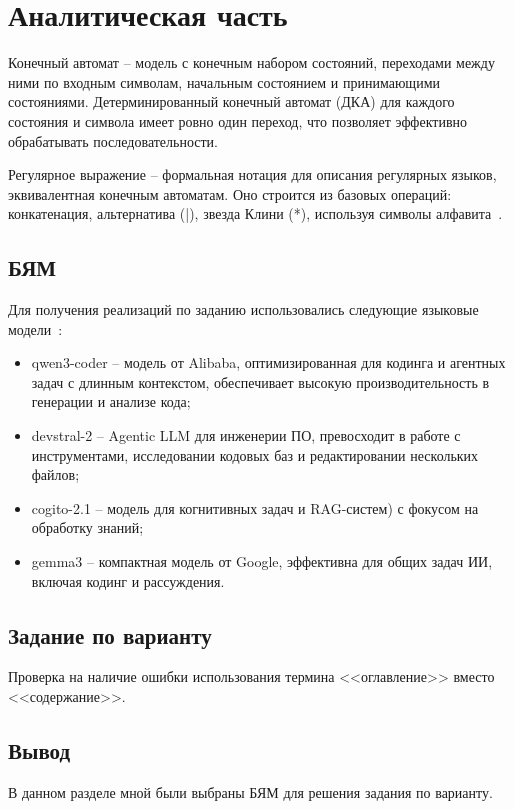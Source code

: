 \chapter{Аналитическая часть}

Конечный автомат -- модель с конечным набором состояний, переходами между ними по входным символам, начальным состоянием и  принимающими состояниями. Детерминированный конечный автомат (ДКА) для каждого состояния и символа имеет ровно один переход, что позволяет эффективно обрабатывать последовательности.

Регулярное выражение -- формальная нотация для описания регулярных языков, эквивалентная конечным автоматам. Оно строится из базовых операций: конкатенация, альтернатива (|), звезда Клини (*), используя символы алфавита~\cite{lit2}.

\section{БЯМ}

Для получения реализаций по заданию использовались следующие языковые модели~\cite{lit1}:
\begin{itemize}
	\item qwen3-coder -- модель от Alibaba, оптимизированная для кодинга и агентных задач с длинным контекстом, обеспечивает высокую производительность в генерации и анализе кода;
	\item devstral-2 -- Agentic LLM для инженерии ПО, превосходит в работе с инструментами, исследовании кодовых баз и редактировании нескольких файлов;
	\item cogito-2.1 -- модель для когнитивных задач и RAG-систем) с фокусом на обработку знаний;
	\item gemma3 -- компактная модель от Google, эффективна для общих задач ИИ, включая кодинг и рассуждения.
\end{itemize}

\section{Задание по варианту}

Проверка на наличие ошибки использования термина <<оглавление>> вместо <<содержание>>.

\section*{Вывод}

В данном разделе мной были выбраны БЯМ для решения задания по варианту.

\clearpage
